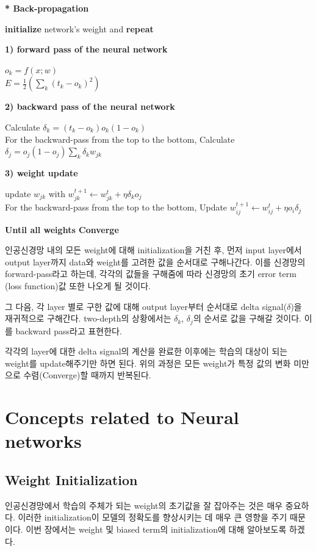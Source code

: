 \documentclass[draft=false]{oblivoir}
\begin{document}
\textbf{* Back-propagation}
\begin{center}
\textbf{initialize} network's weight and \textbf{repeat}

\textbf{1) forward pass of the neural network}
\begin{center}
    $o_{k} = f(x;w)$\\
    $E = \frac{1}{2}(\sum_{k}(t_{k}-o_{k})^{2})$
\end{center}

\textbf{2) backward pass of the neural network}
\begin{center}
    Calculate $\delta_{k} = (t_{k}-o_{k})o_{k}(1-o_{k})$\\
    For the backward-pass from the top to the bottom, Calculate $\delta_{j} = o_{j}(1-o_{j})\sum_{k}\delta_{k}w_{jk}$
\end{center}

\textbf{3) weight update}
\begin{center}
    update $w_{jk}$ with $w^{t+1}_{jk} \leftarrow w^{t}_{jk} + \eta\delta_{k}o_{j}$\\
    For the backward-pass from the top to the bottom, Update $w^{t+1}_{ij} \leftarrow w^{t}_{ij} + \eta o_{i}\delta_{j}$
\end{center}
\textbf{Until all weights Converge}\\
\end{center}

인공신경망 내의 모든 weight에 대해 initialization을 거친 후, 먼저 input layer에서 output layer까지 data와 weight를 고려한 값을 순서대로 구해나간다. 이를 신경망의 forward-pass라고 하는데, 각각의 값들을 구해줌에 따라 신경망의 초기 error term (loss function)값 또한 나오게 될 것이다. 

그 다음, 각 layer 별로 구한 값에 대해 output layer부터 순서대로 delta signal($\delta$)을 재귀적으로 구해간다. two-depth의 상황에서는 $\delta_{k}$, $\delta_{j}$의 순서로 값을 구해갈 것이다. 이를 backward pass라고 표현한다. 

각각의 layer에 대한 delta signal의 계산을 완료한 이후에는 학습의 대상이 되는 weight를 update해주기만 하면 된다. 위의 과정은 모든 weight가 특정 값의 변화 미만으로 수렴(Converge)할 때까지 반복된다. 
\section{Concepts related to Neural networks}
\subsection{Weight Initialization}
인공신경망에서 학습의 주체가 되는 weight의 초기값을 잘 잡아주는 것은 매우 중요하다. 이러한 initialization이 모델의 정확도를 향상시키는 데 매우 큰 영향을 주기 때문이다. 이번 장에서는 weight 및 biased term의 initialization에 대해 알아보도록 하겠다.
\end{document}

